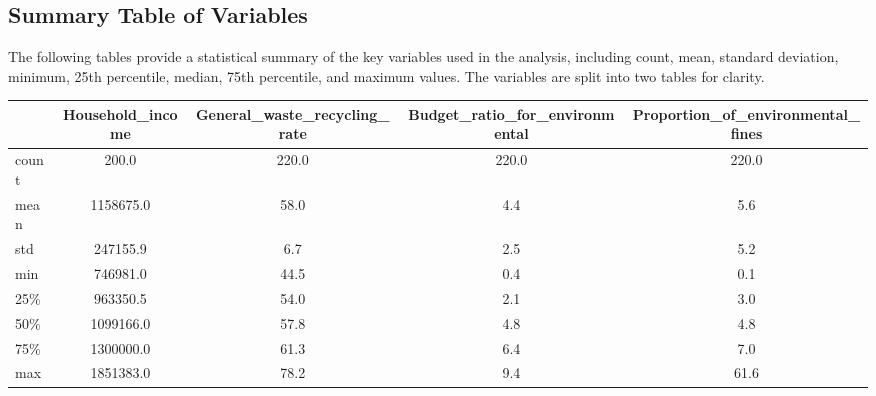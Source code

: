 \documentclass{article}
\begin{document}
\subsection{Summary Table of Variables}
The following tables provide a statistical summary of the key variables used in the analysis, including count, mean, standard deviation, minimum, 25th percentile, median, 75th percentile, and maximum values. The variables are split into two tables for clarity.
\begin{table}[H]
    \centering
    \footnotesize
    \begin{tabular}{l S[round-precision=1,round-mode=places] S[round-precision=1,round-mode=places] S[round-precision=1,round-mode=places] S[round-precision=1,round-mode=places]}
    \toprule
     & {Household\_income} & {General\_waste\_recycling\_rate} & {Budget\_ratio\_for\_environmental} & {Proportion\_of\_environmental\_fines} \\
    \midrule
    count & 200.0 & 220.0 & 220.0 & 220.0 \\
    mean & 1158675.0 & 58.0 & 4.4 & 5.6 \\
    std & 247155.9 & 6.7 & 2.5 & 5.2 \\
    min & 746981.0 & 44.5 & 0.4 & 0.1 \\
    25\% & 963350.5 & 54.0 & 2.1 & 3.0 \\
    50\% & 1099166.0 & 57.8 & 4.8 & 4.8 \\
    75\% & 1300000.0 & 61.3 & 6.4 & 7.0 \\
    max & 1851383.0 & 78.2 & 9.4 & 61.6 \\
    \bottomrule
    \end{tabular}
    \label{tab:summary-stats-part1}
    \end{table}
    
\end{document}
